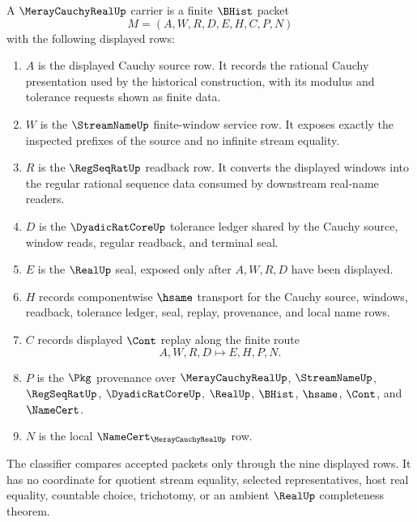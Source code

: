 \begin{definition}
\label{def:meray-cauchy-real-carrier}
A $\MerayCauchyRealUp$ carrier is a finite $\BHist$ packet
$$
M=(A,W,R,D,E,H,C,P,N)
$$
with the following displayed rows:
\begin{enumerate}
\item $A$ is the displayed Cauchy source row. It records the rational Cauchy presentation used by the historical construction, with its modulus and tolerance requests shown as finite data.
\item $W$ is the $\StreamNameUp$ finite-window service row. It exposes exactly the inspected prefixes of the source and no infinite stream equality.
\item $R$ is the $\RegSeqRatUp$ readback row. It converts the displayed windows into the regular rational sequence data consumed by downstream real-name readers.
\item $D$ is the $\DyadicRatCoreUp$ tolerance ledger shared by the Cauchy source, window reads, regular readback, and terminal seal.
\item $E$ is the $\RealUp$ seal, exposed only after $A,W,R,D$ have been displayed.
\item $H$ records componentwise $\hsame$ transport for the Cauchy source, windows, readback, tolerance ledger, seal, replay, provenance, and local name rows.
\item $C$ records displayed $\Cont$ replay along the finite route
$$
A,W,R,D \longmapsto E,H,P,N .
$$
\item $P$ is the $\Pkg$ provenance over $\MerayCauchyRealUp$, $\StreamNameUp$, $\RegSeqRatUp$, $\DyadicRatCoreUp$, $\RealUp$, $\BHist$, $\hsame$, $\Cont$, and $\NameCert$.
\item $N$ is the local $\NameCert_{\MerayCauchyRealUp}$ row.
\end{enumerate}
The classifier compares accepted packets only through the nine displayed rows. It has no coordinate for quotient stream equality, selected representatives, host real equality, countable choice, trichotomy, or an ambient $\RealUp$ completeness theorem.
\end{definition}

